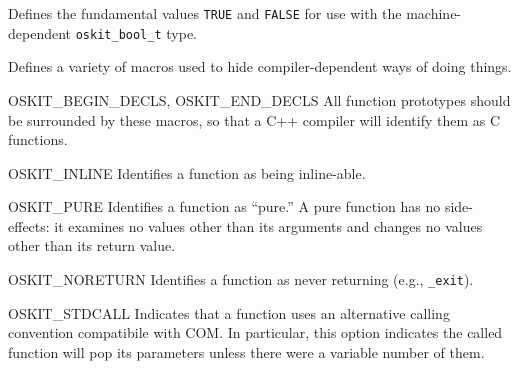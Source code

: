 \label{oskit-boolean-h}
\begin{apisyn}
\end{apisyn}
\begin{apidesc}
	Defines the fundamental values
	{\tt TRUE} 
	and
	{\tt FALSE} 
	for use with the machine-dependent {\tt oskit_bool_t} type.
\end{apidesc}

\label{oskit-compiler-h}
\begin{apisyn}
\end{apisyn}
\begin{apidesc}
	Defines a variety of macros used to hide compiler-dependent ways
	of doing things.

	\begin{csymlist}
	\item[OSKIT_BEGIN_DECLS, OSKIT_END_DECLS]
		 
		All function prototypes should be surrounded by these macros,
		so that a C++ compiler will identify them as C functions.
	\item[OSKIT_INLINE]
		Identifies a function as being inline-able.
	\item[OSKIT_PURE]
		Identifies a function as ``pure.''
		A pure function has no side-effects:
		it examines no values other than its arguments
		and changes no values other than its return value.
	\item[OSKIT_NORETURN]
		Identifies a function as never returning (e.g., {\tt _exit}).
	\item[OSKIT_STDCALL]
		Indicates that a function
		uses an alternative calling convention compatibile with COM\@.
		In particular,
		this option indicates the called function will pop its
		parameters unless there were a variable number of them.
	\end{csymlist}
\end{apidesc}

